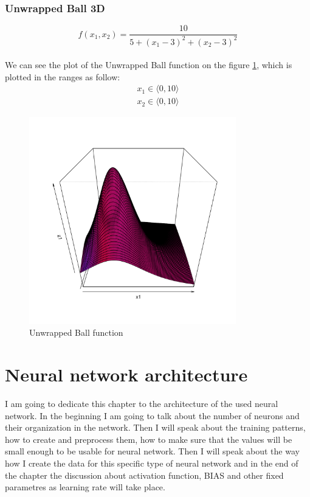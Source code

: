 \documentclass[a4paper,oneside,onecolumn,11pt]{report}
\begin{document}
		\subsection{Unwrapped Ball 3D}
			\begin{equation}
				f(x_1, x_2) = \frac{10}{5 + (x_1 - 3)^2 + (x_2 - 3)^2}
			\end{equation}\\
			We can see the plot of the Unwrapped Ball function on the figure \ref{ball}, which is plotted in the 
			ranges as follow:
			\begin{equation}
				\begin{aligned}
				x_1 \in \langle 0, 10 \rangle\\
				x_2 \in \langle 0, 10 \rangle
				\end{aligned}
			\end{equation}
			\begin{figure}
				\centering
				\includegraphics[width=90mm]{fig/unwrapped_ball_col.pdf}
				\caption{Unwrapped Ball function}
				\label{ball}
			\end{figure}

\chapter{Neural network architecture}
	I am going to dedicate this chapter to the architecture of the used neural network. In the 
	beginning I am going to talk about the number of neurons and their organization in the network.
	Then I will speak about the training patterns, how to create and preprocess them, how to make 
	sure that the values will be small enough to be usable for neural network. Then I will speak 
	about the way how I create the data for this specific type of neural network and in the end 
	of the chapter the discussion about activation function, BIAS and other fixed parametres as 
	learning rate will take place.
\end{document}
